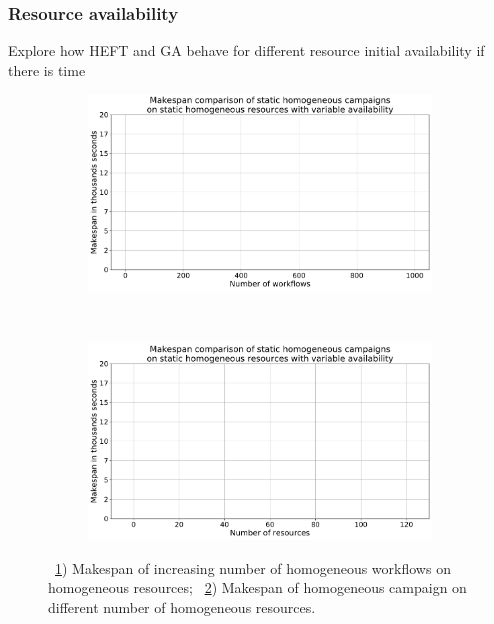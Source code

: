\subsubsection{Resource availability}

Explore how HEFT and GA behave for different resource initial availability if there is time
\begin{figure}[ht!]
    \centering
    \begin{subfigure}[b]{0.45\textwidth}
        \includegraphics[width=.95\textwidth]{figures/campaign/StHomoCampaigns_4VarHomoResources.pdf}
        \caption{}
        \label{fig:StHomoCampaigns_4VarHomoResources}
    \end{subfigure}%
    ~ 
    \begin{subfigure}[b]{0.45\textwidth}
        \includegraphics[width=\linewidth]{figures/campaign/VarHomoResources_StHomoCampaigns.pdf}
        \caption{}
        \label{fig:VarHomoResources_StHomoCampaigns}
    \end{subfigure}
    \caption{~\ref{fig:StHomoCampaigns_4VarHomoResources}) Makespan of increasing number of homogeneous workflows on homogeneous resources;
        ~\ref{fig:VarHomoResources_StHomoCampaigns}) Makespan of homogeneous campaign on different number of homogeneous resources.}
    \label{fig:resource_avail}
\end{figure}

